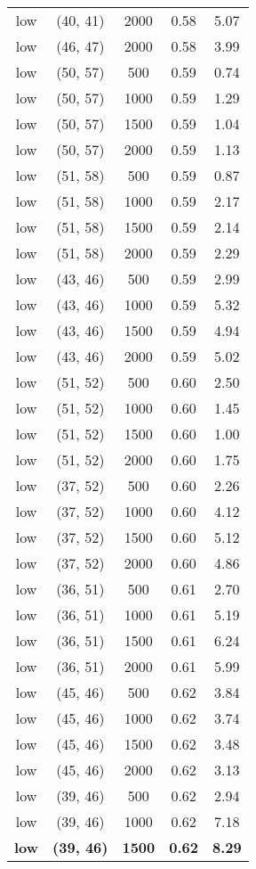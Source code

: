 \begin{tabular}{c c c c c}
low & (40, 41) &  2000 & 0.58 & 5.07 \\
low & (46, 47) &  2000 & 0.58 & 3.99 \\
low & (50, 57) &  500 & 0.59 & 0.74 \\
low & (50, 57) &  1000 & 0.59 & 1.29 \\
low & (50, 57) &  1500 & 0.59 & 1.04 \\
low & (50, 57) &  2000 & 0.59 & 1.13 \\
low & (51, 58) &  500 & 0.59 & 0.87 \\
low & (51, 58) &  1000 & 0.59 & 2.17 \\
low & (51, 58) &  1500 & 0.59 & 2.14 \\
low & (51, 58) &  2000 & 0.59 & 2.29 \\
low & (43, 46) &  500 & 0.59 & 2.99 \\
low & (43, 46) &  1000 & 0.59 & 5.32 \\
low & (43, 46) &  1500 & 0.59 & 4.94 \\
low & (43, 46) &  2000 & 0.59 & 5.02 \\
low & (51, 52) &  500 & 0.60 & 2.50 \\
low & (51, 52) &  1000 & 0.60 & 1.45 \\
low & (51, 52) &  1500 & 0.60 & 1.00 \\
low & (51, 52) &  2000 & 0.60 & 1.75 \\
low & (37, 52) &  500 & 0.60 & 2.26 \\
low & (37, 52) &  1000 & 0.60 & 4.12 \\
low & (37, 52) &  1500 & 0.60 & 5.12 \\
low & (37, 52) &  2000 & 0.60 & 4.86 \\
low & (36, 51) &  500 & 0.61 & 2.70 \\
low & (36, 51) &  1000 & 0.61 & 5.19 \\
low & (36, 51) &  1500 & 0.61 & 6.24 \\
low & (36, 51) &  2000 & 0.61 & 5.99 \\
low & (45, 46) &  500 & 0.62 & 3.84 \\
low & (45, 46) &  1000 & 0.62 & 3.74 \\
low & (45, 46) &  1500 & 0.62 & 3.48 \\
low & (45, 46) &  2000 & 0.62 & 3.13 \\
low & (39, 46) &  500 & 0.62 & 2.94 \\
low & (39, 46) &  1000 & 0.62 & 7.18 \\
\textbf{low} & \textbf{(39, 46)} & \textbf{ 1500} & \textbf{0.62} & \textbf{8.29} \\

\end{tabular}
